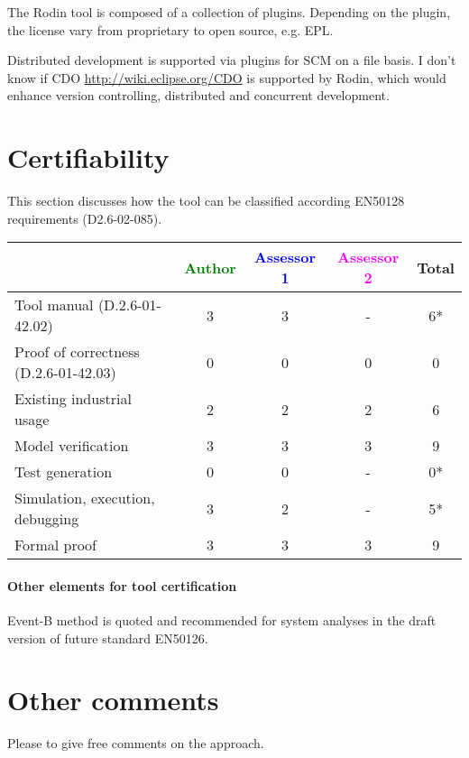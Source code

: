 \begin{assessor2}
  The Rodin tool is composed of a collection of plugins. Depending on
  the plugin, the license vary from proprietary to open source,
  e.g. EPL.
\end{assessor2}

\begin{assessor2}
  Distributed development is supported via plugins for SCM on a file
  basis. I don't know if CDO \url{http://wiki.eclipse.org/CDO} is
  supported by Rodin, which would enhance version controlling,
  distributed and concurrent development.
\end{assessor2}

\section{Certifiability}

This section discusses how the tool can be classified according EN50128 requirements (D2.6-02-085).


\begin{tabular}{|l | c | c | c | c|}
\hline
& \textcolor{green}{Author} & \textcolor{blue}{Assessor 1} & \textcolor{magenta}{Assessor 2} & Total \\
\hline 
Tool manual (D.2.6-01-42.02) & 3 & 3 & - & 6*  \\
\hline
Proof of correctness (D.2.6-01-42.03)   & 0 & 0 & 0 & 0 \\
\hline
Existing industrial usage  & 2 & 2 & 2 & 6 \\
\hline
Model verification & 3 & 3 & 3 & 9 \\
\hline
Test generation & 0 & 0 & - & 0* \\
\hline
Simulation, execution, debugging & 3 & 2 & - & 5* \\
\hline
Formal proof &3  & 3 & 3 & 9 \\
\hline
\end{tabular}

\paragraph{Other elements for tool certification}

\begin{author_comment}
Event-B method is quoted and recommended for system analyses in the draft version of future standard EN50126.

\end{author_comment}

\section{Other comments}
Please to  give free comments on the approach.



